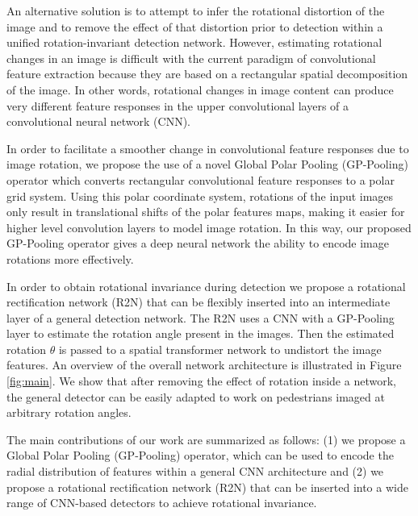 \documentclass[10pt,twocolumn,letterpaper]{article}
\begin{document}
An alternative solution is to attempt to infer the rotational distortion of the image and to remove the effect of that distortion prior to detection within a unified rotation-invariant detection network. However, estimating rotational changes in an image is difficult with the current paradigm of convolutional feature extraction because they are based on a rectangular spatial decomposition of the image. In other words, rotational changes in image content can produce very different feature responses in the upper convolutional layers of a convolutional neural network (CNN). 

In order to facilitate a smoother change in convolutional feature responses due to image rotation, we propose the use of a novel Global Polar Pooling (GP-Pooling) operator which converts rectangular convolutional feature responses to a polar grid system. Using this polar coordinate system, rotations of the input images only result in translational shifts of the polar features maps, making it easier for higher level convolution layers to model image rotation. In this way, our proposed GP-Pooling operator gives a deep neural network the ability to encode image rotations more effectively. 

In order to obtain rotational invariance during detection we propose a rotational rectification network (R2N) that can be flexibly inserted into an intermediate layer of a general detection network. The R2N uses a CNN with a GP-Pooling layer to estimate the rotation angle present in the images. Then the estimated rotation $\theta$ is passed to a spatial transformer network to undistort the image features. An overview of the overall network architecture is illustrated in Figure \ref{fig:main}. We show that after removing the effect of rotation inside a network, the general detector can be easily adapted to work on pedestrians imaged at arbitrary rotation angles.

The main contributions of our work are summarized as follows: (1) we propose a Global Polar Pooling (GP-Pooling) operator, which can be used to encode the radial distribution of features within a general CNN architecture and (2) we propose a rotational rectification network (R2N) that can be inserted into a wide range of CNN-based detectors to achieve rotational invariance.


\end{document}
